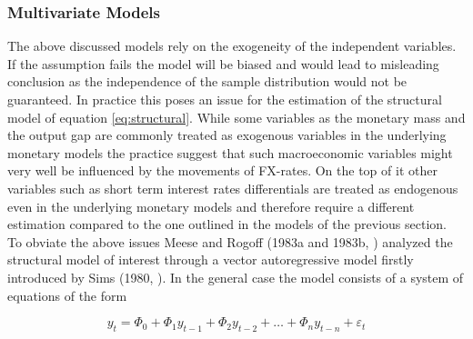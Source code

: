 \subsubsection{Multivariate Models}
The above discussed models rely on the exogeneity of the independent variables. If the assumption
fails the model will be biased and would lead to misleading conclusion as the independence of the
sample distribution would not be guaranteed. In practice this poses an issue for the estimation
of the structural model of equation \ref{eq:structural}. While some variables as the monetary
mass and the output gap are commonly treated as exogenous variables in the underlying monetary models
the practice suggest that such macroeconomic variables might very well be influenced by the
movements of FX-rates. On the top of it other variables such as short term interest rates differentials
are treated as endogenous even in the underlying monetary models and therefore require a different estimation
compared to the one outlined in the models of the previous section.\\
To obviate the above issues Meese and Rogoff (1983a and 1983b, \cite{MeeseRogoffa, MeeseRogoffb}) analyzed the structural model
of interest through a vector autoregressive model firstly introduced by Sims (1980, \cite{Sims1980}).
In the general case the model consists of a system of equations of the form

\begin{equation} \label{eq:VAR}
y_{t} =  \Phi_{0}+ \Phi_{1}y_{t-1} + \Phi_{2}y_{t-2} + \dots + \Phi_{n}y_{t-n} + \varepsilon_{t}
\end{equation}

